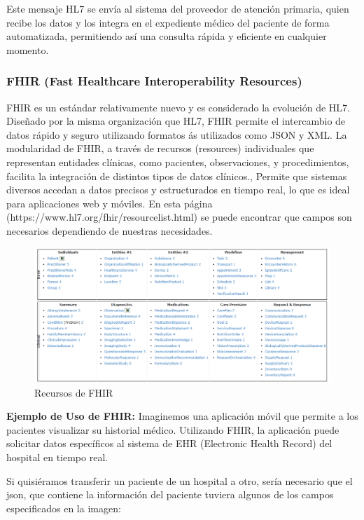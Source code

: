 \documentclass[12pt, a4paper, twoside]{article}
\begin{document}
	Este mensaje HL7 se envía al sistema del proveedor de atención primaria, quien recibe los datos y los integra en el expediente médico del paciente de forma automatizada, permitiendo así una consulta rápida y eficiente en cualquier momento.
	
	
	\subsubsection{FHIR (Fast Healthcare Interoperability Resources)} 
	
	FHIR es un estándar relativamente nuevo y es considerado la evolución de HL7. Diseñado por la misma organización que HL7, FHIR permite el intercambio de datos rápido y seguro utilizando formatos ás utilizados como JSON y XML. La modularidad de FHIR, a través de recursos (resources) individuales que representan entidades clínicas, como pacientes, observaciones, y procedimientos, facilita la integración de distintos tipos de datos clínicos., Permite que sistemas diversos accedan a datos precisos y estructurados en tiempo real, lo que es ideal para aplicaciones web y móviles.
	En esta página (https://www.hl7.org/fhir/resourcelist.html) se puede encontrar que campos son necesarios dependiendo de nuestras necesidades. 
	
	\begin{figure}[h!]
		\includegraphics[width=1\textwidth]{image/1.png}
		\caption{Recursos de FHIR}
		\label{fig:1}
	\end{figure}
	\vspace{5cm}
	
	\textbf{Ejemplo de Uso de FHIR:} Imaginemos una aplicación móvil que permite a los pacientes visualizar su historial médico. Utilizando FHIR, la aplicación puede solicitar datos específicos al sistema de EHR (Electronic Health Record) del hospital en tiempo real.
	
	Si quisiéramos transferir un paciente de un hospital a otro, sería necesario que el json, que contiene la información del paciente tuviera algunos de los campos especificados en la imagen:
	
\end{document}
